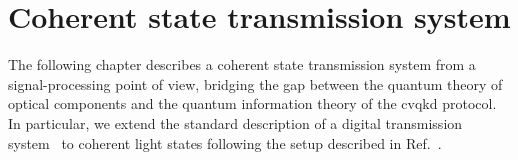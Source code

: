 \chapter{Coherent state transmission system}

The following chapter describes a coherent state transmission system from a signal-processing point of view, bridging the gap between the quantum theory of optical components and the quantum information theory of the \gls{cvqkd} protocol. In particular, we extend the standard description of a digital transmission system~\cite{Gallager2008,Nossek2015,Oppenheim1989,Proakis2007} to coherent light states following the setup described in Ref.~\cite{Brunner2017}.
